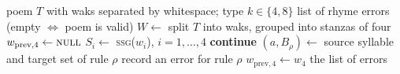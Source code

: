 \documentclass[conference]{IEEEtran}
\begin{document}
\begin{algorithm}[t]
\caption{Rhyme verification of a Klon-Paed poem (\texttt{check\_klon}).}
\label{alg:klonalg}
\begin{algorithmic}[1]
\REQUIRE poem $T$ with waks separated by whitespace; type $k\in\{4,8\}$
\ENSURE list of rhyme errors (empty $\Leftrightarrow$ poem is valid)
\STATE $W\gets$ split $T$ into waks, grouped into stanzas of four
\STATE $w_{\mathrm{prev},4}\gets\textsc{null}$
  \STATE $S_i\gets$ \textsc{ssg}($w_i$), $i=1,\ldots,4$ 
      \STATE \textbf{continue} 
    \ENDIF
    \STATE $(a,B_\rho)\gets$ source syllable and target set of rule $\rho$
      \STATE record an error for rule $\rho$
    \ENDIF
  \ENDFOR
  \STATE $w_{\mathrm{prev},4}\gets w_4$ 
\ENDFOR
\RETURN the list of errors
\end{algorithmic}
\end{algorithm}
\end{document}

